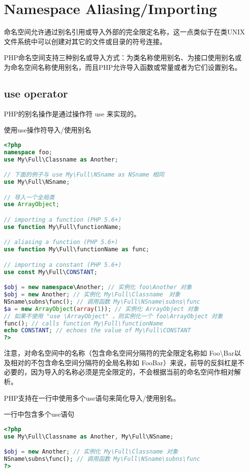 \chapter{Namespace Aliasing/Importing}

命名空间允许通过别名引用或导入外部的完全限定名称，这一点类似于在类UNIX文件系统中可以创建对其它的文件或目录的符号连接。

PHP命名空间支持三种别名或导入方式：为类名称使用别名、为接口使用别名或为命名空间名称使用别名，而且PHP允许导入函数或常量或者为它们设置别名。

\section{use operator}


PHP的别名操作是通过操作符 use 来实现的。

\begin{example}
使用use操作符导入/使用别名
\begin{lstlisting}[language=PHP]
<?php
namespace foo;
use My\Full\Classname as Another;

// 下面的例子与 use My\Full\NSname as NSname 相同
use My\Full\NSname;

// 导入一个全局类
use ArrayObject;

// importing a function (PHP 5.6+)
use function My\Full\functionName;

// aliasing a function (PHP 5.6+)
use function My\Full\functionName as func;

// importing a constant (PHP 5.6+)
use const My\Full\CONSTANT;

$obj = new namespace\Another; // 实例化 foo\Another 对象
$obj = new Another; // 实例化 My\Full\Classname　对象
NSname\subns\func(); // 调用函数 My\Full\NSname\subns\func
$a = new ArrayObject(array(1)); // 实例化 ArrayObject 对象
// 如果不使用 "use \ArrayObject" ，则实例化一个 foo\ArrayObject 对象
func(); // calls function My\Full\functionName
echo CONSTANT; // echoes the value of My\Full\CONSTANT
?>
\end{lstlisting}
\end{example}

注意，对命名空间中的名称（包含命名空间分隔符的完全限定名称如 Foo\textbackslash Bar以及相对的不包含命名空间分隔符的全局名称如 FooBar）来说，前导的反斜杠是不必要的，因为导入的名称必须是完全限定的，不会根据当前的命名空间作相对解析。 

PHP支持在一行中使用多个use语句来简化导入/使用别名。

\begin{example}
一行中包含多个use语句
\begin{lstlisting}[language=PHP]
<?php
use My\Full\Classname as Another, My\Full\NSname;

$obj = new Another; // 实例化 My\Full\Classname 对象
NSname\subns\func(); // 调用函数 My\Full\NSname\subns\func
?>
\end{lstlisting}
\end{example}

